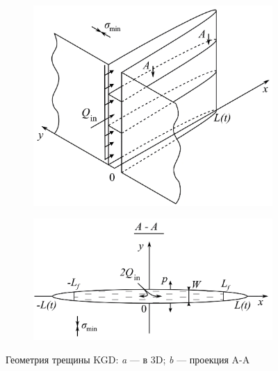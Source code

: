 \begin{figure}[H]
	\begin{subfigure}[t]{\dimexpr.5\linewidth-1.3em\relax}
		\centering
		\includegraphics[width=.95\linewidth,valign=t]{images/kgd_model_3D.jpg}
	\end{subfigure}
\hfill %
	\begin{subfigure}[t]{\dimexpr.5\linewidth-1.3em\relax}
		\centering
		\includegraphics[width=.95\linewidth,valign=t]{images/kgd_model_A-A_plane.jpg}
	\end{subfigure}
\captionsetup{justification=centering} %
\caption{Геометрия трещины KGD: {\itshape a} --- в 3D; {\itshape b} --- проекция A-A} 
\label{fig:kgd-model}
\end{figure}

